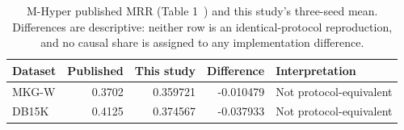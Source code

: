 \begin{table}[tbp]
\centering\small
\caption{M-Hyper published MRR (Table 1~\citep{mhyper}) and this study's three-seed mean. Differences are descriptive: neither row is an identical-protocol reproduction, and no causal share is assigned to any implementation difference.}
\label{tab:data-public}
\begin{tabular}{lrrrl}
\toprule
Dataset & Published & This study & Difference & Interpretation\\
\midrule
MKG-W & 0.3702 & 0.359721 & -0.010479 & Not protocol-equivalent\\
DB15K & 0.4125 & 0.374567 & -0.037933 & Not protocol-equivalent\\
\bottomrule
\end{tabular}
\end{table}
